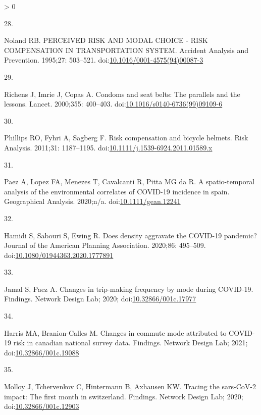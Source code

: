\documentclass[10pt,letterpaper]{article}
\newlength{\csllabelwidth}
\newlength{\cslhangindent}
\newenvironment{CSLReferences}[3] %
 {%
  \setlength{\parindent}{0pt}
  \ifodd #1 \everypar{\setlength{\hangindent}{\cslhangindent}}\ignorespaces\fi
  \ifnum #2 > 0
  \setlength{\parskip}{#2\baselineskip}
  \fi
 }%
 {}
\newcommand{\CSLLeftMargin}[1]{\parbox[t]{\csllabelwidth}{#1}}
\newcommand{\CSLRightInline}[1]{\parbox[t]{\linewidth - \csllabelwidth}{#1}}
\begin{document}
\begin{CSLReferences}{0}{0}
\leavevmode\hypertarget{ref-Noland1995perceived}{}%
\CSLLeftMargin{28. }
\CSLRightInline{Noland RB. PERCEIVED RISK AND MODAL CHOICE - RISK
COMPENSATION IN TRANSPORTATION SYSTEM. Accident Analysis and Prevention.
1995;27: 503--521.
doi:\href{https://doi.org/10.1016/0001-4575(94)00087-3}{10.1016/0001-4575(94)00087-3}}

\leavevmode\hypertarget{ref-Richens2000condoms}{}%
\CSLLeftMargin{29. }
\CSLRightInline{Richens J, Imrie J, Copas A. Condoms and seat belts: The
parallels and the lessons. Lancet. 2000;355: 400--403.
doi:\href{https://doi.org/10.1016/s0140-6736(99)09109-6}{10.1016/s0140-6736(99)09109-6}}

\leavevmode\hypertarget{ref-Phillips2011risk}{}%
\CSLLeftMargin{30. }
\CSLRightInline{Phillips RO, Fyhri A, Sagberg F. Risk compensation and
bicycle helmets. Risk Analysis. 2011;31: 1187--1195.
doi:\href{https://doi.org/10.1111/j.1539-6924.2011.01589.x}{10.1111/j.1539-6924.2011.01589.x}}

\leavevmode\hypertarget{ref-Paez2020spatio}{}%
\CSLLeftMargin{31. }
\CSLRightInline{Paez A, Lopez FA, Menezes T, Cavalcanti R, Pitta MG da
R. A spatio-temporal analysis of the environmental correlates of
COVID-19 incidence in spain. Geographical Analysis. 2020;n/a.
doi:\href{https://doi.org/10.1111/gean.12241}{10.1111/gean.12241}}

\leavevmode\hypertarget{ref-Hamidi2020density}{}%
\CSLLeftMargin{32. }
\CSLRightInline{Hamidi S, Sabouri S, Ewing R. Does density aggravate the
COVID-19 pandemic? Journal of the American Planning Association.
2020;86: 495--509.
doi:\href{https://doi.org/10.1080/01944363.2020.1777891}{10.1080/01944363.2020.1777891}}

\leavevmode\hypertarget{ref-Jamal2020Changes}{}%
\CSLLeftMargin{33. }
\CSLRightInline{Jamal S, Paez A. Changes in trip-making frequency by
mode during COVID-19. Findings. Network Design Lab; 2020;
doi:\href{https://doi.org/10.32866/001c.17977}{10.32866/001c.17977}}

\leavevmode\hypertarget{ref-Harris2021Changes}{}%
\CSLLeftMargin{34. }
\CSLRightInline{Harris MA, Branion-Calles M. Changes in commute mode
attributed to COVID-19 risk in canadian national survey data. Findings.
Network Design Lab; 2021;
doi:\href{https://doi.org/10.32866/001c.19088}{10.32866/001c.19088}}

\leavevmode\hypertarget{ref-Molloy2020Tracing}{}%
\CSLLeftMargin{35. }
\CSLRightInline{Molloy J, Tchervenkov C, Hintermann B, Axhausen KW.
Tracing the sars-CoV-2 impact: The first month in switzerland. Findings.
Network Design Lab; 2020;
doi:\href{https://doi.org/10.32866/001c.12903}{10.32866/001c.12903}}


\end{CSLReferences}
\end{document}
